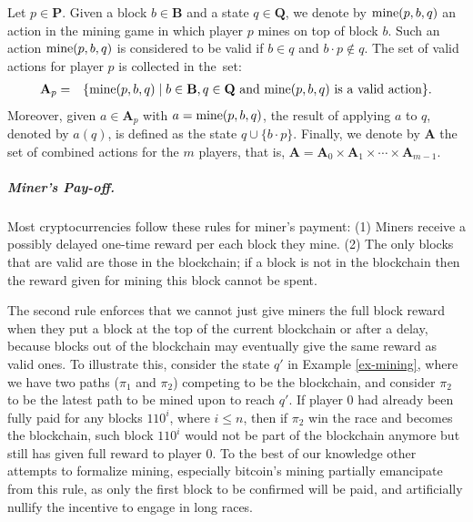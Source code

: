 \documentclass[a4paper,english,cleveref, autoref,numberwithinsect]{lipics-v2019}
\newcommand{\mine}{\text{\rm mine}}
\newcommand{\bP}{\mathbf{P}}
\newcommand{\bB}{\mathbf{B}}
\newcommand{\bA}{\mathbf{A}}
\newcommand{\bQ}{\mathbf{Q}}
\begin{document}
Let $p \in \bP$. Given a block $b \in \bB$ and a state $q \in \bQ$, we denote by $\mine(p,b,q)$ an action in the mining game in which player $p$ mines on top of block $b$. Such an action $\mine(p,b,q)$ is considered to be valid if $b \in q$ and $b\cdot p \not\in q$. The set of valid actions for player $p$ is collected in the~set:
\begin{eqnarray*}
\bA_p & = & \{ \mine(p,b,q) \mid b \in \bB, q \in \bQ \text{ and } \mine(p,b,q) \text{ is a valid action}\}.
\end{eqnarray*}
Moreover, given $a \in \bA_p$ with $a = \mine(p,b,q)$, the result of applying $a$ to $q$, denoted by $a(q)$, is defined as the state $q \cup \{b \cdot p\}$. Finally, we denote by $\bA$ the set of combined actions for the $m$ players, that is, $\bA = \bA_0 \times \bA_1 \times \cdots \times \bA_{m-1}$.

\subparagraph*{Miner's Pay-off.}
Most cryptocurrencies follow these rules for miner's payment:
%
(1) Miners receive a possibly delayed one-time reward per each block they mine. %
%
(2) The only blocks that are valid are those in the blockchain; if a block is not in the blockchain then the reward given for mining this block cannot be spent. 

The second rule enforces that we cannot just give miners the full block reward when they put a block at the top of the current blockchain or after a delay, because blocks out of the blockchain may eventually give the same reward as valid ones. To illustrate this, consider the state $q'$ in Example \ref{ex-mining}, where we have two paths ($\pi_1$ and $\pi_2$) competing to be the blockchain, and consider $\pi_2$ to be the latest path to be mined upon to reach $q'$. If player $0$ had already been fully paid for any blocks $110^i$, where $i \leq n$, then if $\pi_2$ win the race and becomes the blockchain, such block $110^i$ would not be part of the blockchain anymore but still has given full reward to player $0$. To the best of our knowledge other attempts to formalize mining, especially bitcoin's mining partially emancipate from this rule, as only the first block to be confirmed will be paid, and artificially nullify the incentive to engage in long races.
\end{document}
